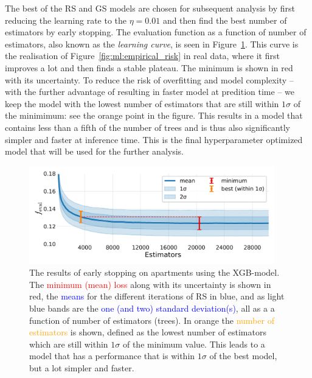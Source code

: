 The best of the RS and GS models are chosen for subsequent analysis by first reducing the learning rate to the $\eta=0.01$ and then find the best number of estimators by early stopping. The evaluation function as a function of number of estimators, also known as the \emph{learning curve}, is seen in Figure~\ref{fig:h:CV_res_ES_learning_curve_ejer}. This curve is the realisation of Figure~\ref{fig:ml:empirical_risk} in real data, where it first improves a lot and then finds a stable plateau. The minimum is shown in red with its uncertainty. To reduce the risk of overfitting and model complexity -- with the further advantage of resulting in faster model at predition time -- we keep the model with the lowest number of estimators that are still within $1\sigma$ of the minimimum: see the orange point in the figure. This results in a model that contains less than a fifth of the number of trees and is thus also significantly simpler and faster at inference time. This is the final hyperparameter optimized model that will be used for the further analysis. 

\begin{figure}
  \includegraphics[draft=false, width=0.95\textwidth, trim=0 0 0 0, clip]{figures/housing/Ejerlejlighed_v19_cut_all_Ncols_all_xgb_early_stopping_fig.png}
  \caption[Early Stopping results]
          {The results of early stopping on apartments using the XGB-model. The \textcolor{red}{minimum (mean) loss} along with its uncertainty is shown in red, the \textcolor{blue}{means} for the different iterations of RS in blue, and as light blue bands are the \textcolor{blue}{one (and two) standard deviation(s)}, all as a a function of number of estimators (trees). In orange the \textcolor{orange}{ number of estimators} is shown, defined as the lowest number of estimators which are still within $1\sigma$ of the minimum value. This leads to a model that has a performance that is within $1\sigma$ of the best model, but a lot simpler and faster.} 
  \label{fig:h:CV_res_ES_learning_curve_ejer}
\end{figure}










